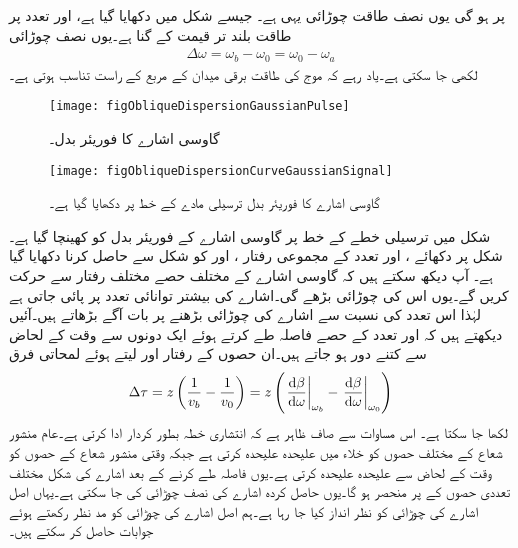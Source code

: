  پر ہو گی یوں  نصف طاقت چوڑائی یہی ہے۔ جیسے شکل  میں دکھایا گیا ہے،  اور  تعدد پر طاقت بلند تر قیمت کے  گنا ہے۔یوں   نصف چوڑائی
\begin{align}
\Delta \omega=\omega_b-\omega_0=\omega_0-\omega_a
\end{align}
لکھی جا سکتی ہے۔یاد رہے کہ موج کی طاقت برقی میدان کے مربع کے راست تناسب ہوتی ہے۔
\begin{figure}
\centering
\texttt{[image: figObliqueDispersionGaussianPulse]}
\caption{گاوسی اشارے کا فوریئر بدل۔}
\label{شکل_ترچھی_گاوسی_اشارہ}
\end{figure}
%
\begin{figure}
\centering
\texttt{[image: figObliqueDispersionCurveGaussianSignal]}
\caption{گاوسی اشارے کا فوریئر بدل ترسیلی مادے کے  خط پر دکھایا گیا ہے۔}
\label{شکل_ترچھی_گاوسی_اشارہ_اور_مادے_کی_خاصیت}
\end{figure}
شکل  میں ترسیلی خطے کے  خط پر گاوسی اشارے کے فوریئر بدل کو کھینچا گیا ہے۔ شکل  پر دکھائے ،  اور  تعدد  کے مجموعی رفتار ،  اور  کو  شکل  سے حاصل کرنا دکھایا گیا ہے۔ آپ دیکھ سکتے ہیں کہ گاوسی اشارے کے مختلف حصے مختلف رفتار سے حرکت کریں گے۔یوں اس کی چوڑائی بڑھے گی۔اشارے کی بیشتر توانائی  تعدد پر پائی جاتی ہے لہٰذا اس تعدد کی نسبت سے اشارے کی چوڑائی بڑھنے  پر بات آگے بڑھاتے ہیں۔آئیں دیکھتے ہیں کہ  اور  تعدد کے حصے  فاصلہ طے کرتے ہوئے ایک دونوں سے وقت کے لحاض سے کتنے دور ہو جاتے ہیں۔ان حصوں کے رفتار  اور  لیتے ہوئے لمحاتی فرق
\begin{align}\label{مساوات_ترچھی_انتشار_چوڑائی_بڑھنا_الف}
\Delta \tau =z\left(\frac{1}{v_b}-\frac{1}{v_0} \right)=z\left(\left . \frac{\dif \beta}{\dif \omega}\right|_{\omega_b}-\left . \frac{\dif \beta}{\dif \omega}\right|_{\omega_0} \right)
\end{align}
لکھا جا سکتا ہے۔ اس مساوات سے صاف ظاہر ہے کہ انتشاری خطہ بطور  کردار ادا کرتی ہے۔عام منشور شعاع کے مختلف حصوں کو خلاء میں علیحدہ علیحدہ کرتی ہے جبکہ وقتی منشور شعاع کے حصوں کو وقت کے لحاض سے علیحدہ علیحدہ کرتی ہے۔یوں  فاصلہ طے کرنے کے بعد اشارے کی شکل مختلف تعددی حصوں کے  پر منحصر ہو گا۔یوں حاصل کردہ اشارے کی  نصف  چوڑائی کی جا سکتی ہے۔یہاں اصل اشارے کی چوڑائی کو نظر انداز کیا جا رہا ہے۔ہم اصل اشارے کی چوڑائی کو مد نظر رکھتے ہوئے جوابات حاصل کر سکتے ہیں۔


